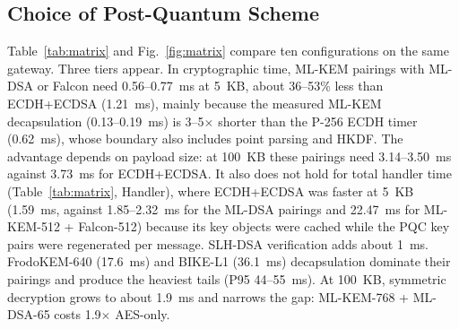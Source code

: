 \documentclass[journal]{IEEEtran}
\begin{document}
\subsection{Choice of Post-Quantum Scheme}
\label{sec:res-matrix}

Table~\ref{tab:matrix} and Fig.~\ref{fig:matrix} compare ten configurations on the same gateway. Three tiers appear. In cryptographic time, ML-KEM pairings with ML-DSA or Falcon need 0.56--0.77~ms at 5~KB, about 36--53\% less than ECDH+ECDSA (1.21~ms), mainly because the measured ML-KEM decapsulation (0.13--0.19~ms) is 3--5$\times$ shorter than the P-256 ECDH timer (0.62~ms), whose boundary also includes point parsing and HKDF. The advantage depends on payload size: at 100~KB these pairings need 3.14--3.50~ms against 3.73~ms for ECDH+ECDSA. It also does not hold for total handler time (Table~\ref{tab:matrix}, Handler), where ECDH+ECDSA was faster at 5~KB (1.59~ms, against 1.85--2.32~ms for the ML-DSA pairings and 22.47~ms for ML-KEM-512 + Falcon-512) because its key objects were cached while the PQC key pairs were regenerated per message. SLH-DSA verification adds about 1~ms. FrodoKEM-640 (17.6~ms) and BIKE-L1 (36.1~ms) decapsulation dominate their pairings and produce the heaviest tails (P95 44--55~ms). At 100~KB, symmetric decryption grows to about 1.9~ms and narrows the gap: ML-KEM-768 + ML-DSA-65 costs 1.9$\times$ AES-only.
\end{document}
